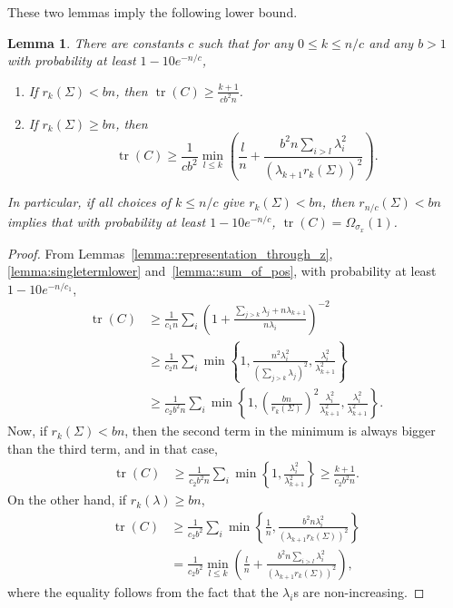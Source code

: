 \documentclass[11pt,notitlepage]{article}
\newcommand\tr {\ensuremath{\operatorname{\mathrm{tr}}}}
\newtheorem{lemma}[theorem]{Lemma}
\begin{document}
These two lemmas imply the following lower bound.
\begin{lemma}\label{lemma:lowerbound}
  There are constants $c$ such that for any $0\le k\le n/c$ and any $ b > 1$
  with probability at least 
$1-10e^{-n/c}$,
  \begin{enumerate}
    \item If $r_k(\Sigma)<bn$, then $\tr(C)\ge\frac{k+1}{c b^2n}$.
    \item If $r_k(\Sigma)\ge bn$, then
        \[
          \tr(C)\ge \frac{1}{cb^2} \min_{l\le k}\left(
          \frac{l}{n} + \frac{b^2n \sum_{i>l} \lambda_i^2}
          {\left(\lambda_{k+1}r_k(\Sigma)\right)^2}\right).
        \]
  \end{enumerate}
  In particular, if all choices of $k\le n/c$ give $r_k(\Sigma)<bn$, then
  $r_{n/c}(\Sigma)<bn$ implies that with probability at least 
$1-10e^{-n/c}$,
  $\tr(C)= \Omega_{\sigma_x}( 1 )$.
\end{lemma}
\begin{proof} 
From Lemmas~\ref{lemma::representation_through_z}, \ref{lemma:singletermlower} and~\ref{lemma::sum_of_pos},
with probability at least 
$1-10e^{-n/c_1}$,
  \begin{align*}
    \tr(C)
      & \ge  \frac{1}{c_1n} \sum_i \left(1+\frac{\sum_{j >k} \lambda_j
        + n\lambda_{k+1}}{n\lambda_i}\right)^{-2} \\
      &\ge \frac{1}{c_2n} \sum_i \min\left\{
        1, \frac{n^2\lambda_i^2}{\left(\sum_{j >k} \lambda_j\right)^2},
        \frac{\lambda_i^2}{\lambda_{k+1}^2}\right\} \\
      &\ge \frac{1}{c_2b^2n}\sum_i \min\left\{
        1, \left(\frac{bn}{r_k(\Sigma)}\right)^2
        \frac{\lambda_i^2}{\lambda_{k+1}^2},
        \frac{\lambda_i^2}{\lambda_{k+1}^2}\right\}.
  \end{align*}
Now, if $r_k(\Sigma)<bn$, then the second term in the minimum
is always bigger than the third term, and in that case,
  \begin{align*}
    \tr(C)
      &\ge\frac{1}{c_2b^2n} \sum_i \min\left\{
        1, \frac{\lambda_i^2}{\lambda_{k+1}^2}\right\}
      \ge \frac{k+1}{c_2b^2n}.
  \end{align*}
On the other hand, if $r_k(\lambda)\ge bn$,
  \begin{align*}
    \tr(C)
      &\ge\frac{1}{c_2b^2} \sum_i \min\left\{
        \frac{1}{n},
        \frac{b^2n\lambda_i^2}
        {\left(\lambda_{k+1}r_k(\Sigma)\right)^2}\right\} \\
      &= \frac{1}{c_2b^2} \min_{l\le k}\left(
        \frac{l}{n} + \frac{b^2n \sum_{i>l} \lambda_i^2}
        {\left(\lambda_{k+1}r_k(\Sigma)\right)^2}\right),
  \end{align*}
where the equality follows from the fact that the $\lambda_i$s are
non-increasing.
\end{proof}
\end{document}

